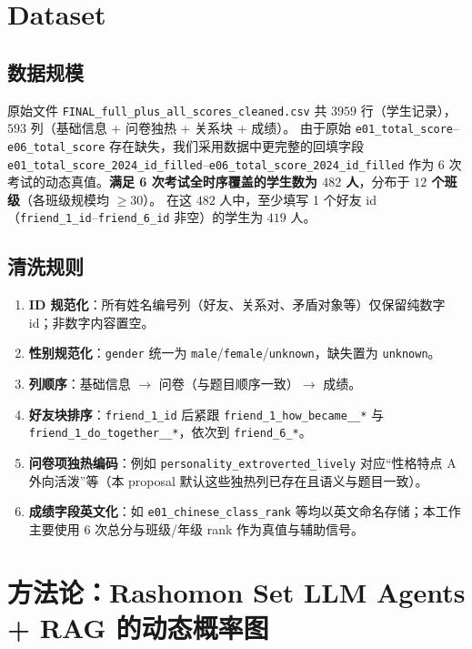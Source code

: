 \documentclass[UTF8, a4paper, 11pt]{ctexart}
\begin{document}
\section{Dataset}
\subsection{数据规模}
原始文件 \texttt{FINAL\_full\_plus\_all\_scores\_cleaned.csv} 共 $3959$ 行（学生记录），$593$ 列（基础信息 + 问卷独热 + 关系块 + 成绩）。
由于原始 \texttt{e01\_total\_score}--\texttt{e06\_total\_score} 存在缺失，我们采用数据中更完整的回填字段 \texttt{e01\_total\_score\_2024\_id\_filled}--\texttt{e06\_total\_score\_2024\_id\_filled} 作为 6 次考试的动态真值。\textbf{满足 6 次考试全时序覆盖的学生数为 $482$ 人}，分布于 \textbf{$12$ 个班级}（各班级规模均 $\ge 30$）。
在这 $482$ 人中，至少填写 1 个好友 id（\texttt{friend\_1\_id}--\texttt{friend\_6\_id} 非空）的学生为 $419$ 人。

\subsection{清洗规则}
\begin{enumerate}[label=\textbf{R\arabic*}.]
    \item \textbf{ID 规范化}：所有姓名编号列（好友、关系对、矛盾对象等）仅保留纯数字 id；非数字内容置空。
    \item \textbf{性别规范化}：\texttt{gender} 统一为 \texttt{male}/\texttt{female}/\texttt{unknown}，缺失置为 \texttt{unknown}。
    \item \textbf{列顺序}：基础信息 $\rightarrow$ 问卷（与题目顺序一致）$\rightarrow$ 成绩。
    \item \textbf{好友块排序}：\texttt{friend\_1\_id} 后紧跟 \texttt{friend\_1\_how\_became\_\_*} 与 \texttt{friend\_1\_do\_together\_\_*}，依次到 \texttt{friend\_6\_*}。
    \item \textbf{问卷项独热编码}：例如 \texttt{personality\_extroverted\_lively} 对应“性格特点 A 外向活泼”等（本 proposal 默认这些独热列已存在且语义与题目一致）。
    \item \textbf{成绩字段英文化}：如 \texttt{e01\_chinese\_class\_rank} 等均以英文命名存储；本工作主要使用 6 次总分与班级/年级 rank 作为真值与辅助信号。
\end{enumerate}

\section{方法论：Rashomon Set LLM Agents + RAG 的动态概率图}
\end{document}
